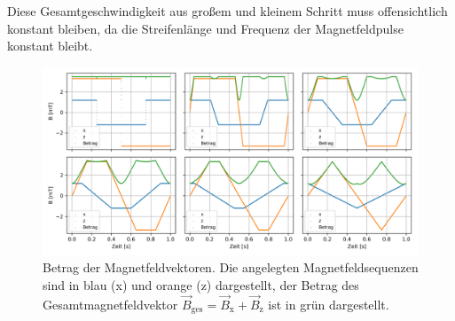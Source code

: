 \documentclass[page,pdftex,12pt,a4paper,twoside,openright]{scrbook}
\begin{document}
Diese Gesamtgeschwindigkeit aus großem und kleinem Schritt muss offensichtlich konstant bleiben, da die Streifenlänge und Frequenz der Magnetfeldpulse konstant bleibt.\\
\begin{figure}[h]
\centering
\includegraphics[width=\textwidth]{./img/magnitude.png}
\caption{\label{fig-betrag}
Betrag der Magnetfeldvektoren. Die angelegten Magnetfeldsequenzen sind in blau (x) und orange (z) dargestellt, der Betrag des Gesamtmagnetfeldvektor \(\vec{B}_\mathrm{ges} = \vec{B}_\mathrm{x} + \vec{B}_\mathrm{z}\) ist in grün dargestellt.}
\end{figure}
\end{document}
